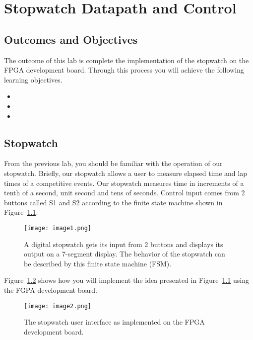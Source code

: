 \chapter{Stopwatch Datapath and Control}
\label{chapter:swDpAndCu}
\graphicspath{ {./Lab11Stopwatch/Fig} }

\section{Outcomes and Objectives}

The outcome of this lab is complete the implementation
of the stopwatch  on the FPGA development board.
Through this process you will achieve the following
learning objectives.
\begin{itemize}
    \item {}
    \item {}
    \item {}
\end{itemize}

\section{Stopwatch}

From the previous lab, you should be familiar with the operation of our
stopwatch. Briefly, our stopwatch allows a user to measure elapsed time
and lap times of a competitive events. Our stopwatch measures time in
increments of a tenth of a second, unit second and tens of seconds.
Control input comes from 2 buttons called S1 and S2 according to the
finite state machine shown in Figure~\ref{fig:swHighLevel}.

\begin{figure}[ht]
    \texttt{[image: image1.png]}
    \caption{A digital stopwatch gets its input from 2 buttons and displays
        its output on a 7-segment display. The behavior of the stopwatch can be
    described by this finite state machine (FSM).}
    \label{fig:swHighLevel}
\end{figure}

Figure~\ref{fig:swDevBoard} shows how you will implement the idea presented in Figure~\ref{fig:swHighLevel}
using the FGPA development board.

\begin{figure}[ht]
    \texttt{[image: image2.png]}
    \caption{The stopwatch user interface as implemented on the FPGA
    development board.}
    \label{fig:swDevBoard}
\end{figure}

